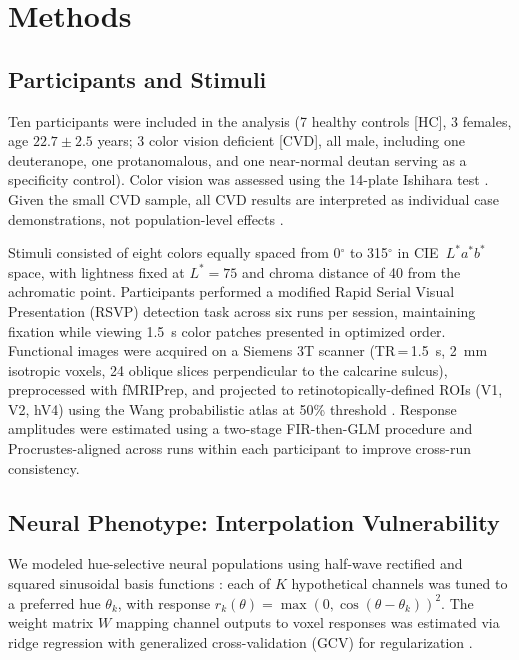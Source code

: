 \documentclass{article}
\begin{document}
\section{Methods}
\label{sec:methods}

\subsection{Participants and Stimuli}

Ten participants were included in the analysis (7 healthy controls [HC], 3 females, age $22.7 \pm 2.5$ years; 3 color vision deficient [CVD], all male, including one deuteranope, one protanomalous, and one near-normal deutan serving as a specificity control).
Color vision was assessed using the 14-plate Ishihara test \cite{placeholder_ishihara1917}.
Given the small CVD sample, all CVD results are interpreted as individual case demonstrations, not population-level effects \cite{placeholder_crawford1998}.

Stimuli consisted of eight colors equally spaced from 0$^\circ$ to 315$^\circ$ in CIE~$L^*a^*b^*$ space, with lightness fixed at $L^* = 75$ and chroma distance of 40 from the achromatic point.
Participants performed a modified Rapid Serial Visual Presentation (RSVP) detection task \cite{placeholder_brouwer2009} across six runs per session, maintaining fixation while viewing 1.5~s color patches presented in optimized order.
Functional images were acquired on a Siemens 3T scanner (TR\,=\,1.5~s, 2~mm isotropic voxels, 24 oblique slices perpendicular to the calcarine sulcus), preprocessed with fMRIPrep, and projected to retinotopically-defined ROIs (V1, V2, hV4) using the Wang probabilistic atlas at 50\% threshold \cite{placeholder_wang2015}.
Response amplitudes were estimated using a two-stage FIR-then-GLM procedure \cite{placeholder_brouwer2009} and Procrustes-aligned across runs within each participant to improve cross-run consistency.

\subsection{Neural Phenotype: Interpolation Vulnerability}

We modeled hue-selective neural populations using half-wave rectified and squared sinusoidal basis functions \cite{placeholder_brouwer2009}: each of $K$ hypothetical channels was tuned to a preferred hue $\theta_k$, with response $r_k(\theta) = \max(0, \cos(\theta - \theta_k))^2$.
The weight matrix $W$ mapping channel outputs to voxel responses was estimated via ridge regression with generalized cross-validation (GCV) for regularization \cite{placeholder_golub1979}.
\end{document}
